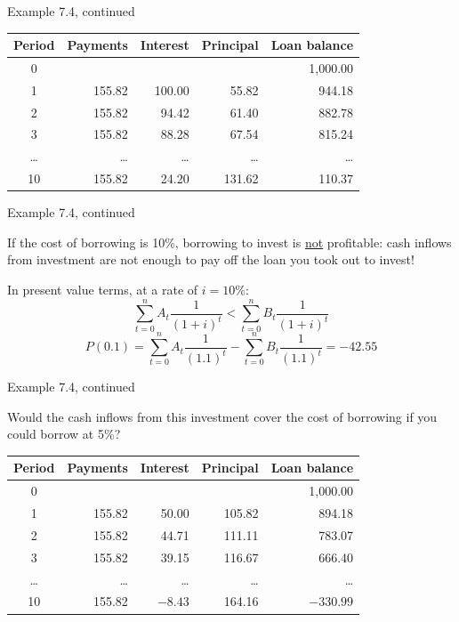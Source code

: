 \documentclass{beamer}
\begin{document}
\begin{frame}{Example 7.4, continued}

\begin{center}
\renewcommand{\arraystretch}{1.3}
\small
\begin{tabular}{crrrr}
\toprule
\textbf{Period} & \textbf{Payments} & \textbf{Interest} & \textbf{Principal} & \textbf{Loan balance} \\
\midrule
0 & & & & 1,000.00 \\
1 & 155.82 & 100.00 & 55.82 & 944.18 \\
2 & 155.82 & 94.42 & 61.40 & 882.78 \\
3 & 155.82 & 88.28 & 67.54 & 815.24 \\
\ldots & \ldots & \ldots & \ldots & \ldots \\
10 & 155.82 & 24.20 & 131.62 & 110.37 \\
\bottomrule
\end{tabular}
\end{center}

\end{frame}

\begin{frame}{Example 7.4, continued}

If the cost of borrowing is 10\%, borrowing to invest is \underline{not} profitable: cash inflows from investment are not enough to pay off the loan you took out to invest!

\medskip
In present value terms, at a rate of $i = 10\%$:
\[
\sum_{t=0}^{n} A_t \frac{1}{(1+i)^t} < \sum_{t=0}^{n} B_t \frac{1}{(1+i)^t}
\]
\[
P(0.1) = \sum_{t=0}^{n} A_t \frac{1}{(1.1)^t} - \sum_{t=0}^{n} B_t \frac{1}{(1.1)^t} = -42.55
\]

\end{frame}

\begin{frame}{Example 7.4, continued}

Would the cash inflows from this investment cover the cost of borrowing if you could borrow at 5\%?

\begin{center}
\renewcommand{\arraystretch}{1.3}
\small
\begin{tabular}{crrrr}
\toprule
\textbf{Period} & \textbf{Payments} & \textbf{Interest} & \textbf{Principal} & \textbf{Loan balance} \\
\midrule
0 & & & & 1,000.00 \\
1 & 155.82 & 50.00 & 105.82 & 894.18 \\
2 & 155.82 & 44.71 & 111.11 & 783.07 \\
3 & 155.82 & 39.15 & 116.67 & 666.40 \\
\ldots & \ldots & \ldots & \ldots & \ldots \\
10 & 155.82 & $-8.43$ & 164.16 & $-330.99$ \\
\bottomrule
\end{tabular}
\end{center}

\end{frame}
\end{document}
